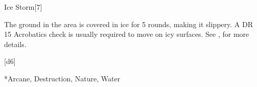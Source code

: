 \begin{spellsection}{Ice Storm}[7]
    \begin{spellheader}
    \end{spellheader}
    \begin{spellcontent}
        \begin{spelltargetinginfo}
        \end{spelltargetinginfo}
        \begin{spelleffects}
            \spelleffect The ground in the area is covered in ice for 5 rounds, making it slippery. A DR 15 Acrobatics check is usually required to move on icy surfaces. See , for more details.
        \end{spelleffects}
    \end{spellcontent}
    \begin{spellsubcontent}
        \begin{spelltargetinginfo}
        \end{spelltargetinginfo}
        \begin{spelleffects}
            \spelleffect {}[d6]
        \end{spelleffects}
    \end{spellsubcontent}
    \begin{spellfooter}
        *{Arcane, Destruction, Nature, Water}
        \miscastyou
    \end{spellfooter}
\end{spellsection}

